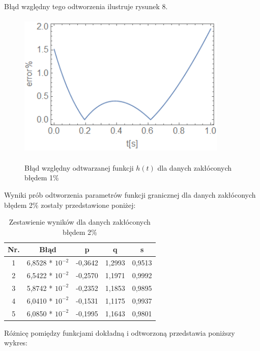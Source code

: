 \documentclass[twoside]{projektInzynierskiMS1}
\begin{document}
Błąd względny tego odtworzenia ilustruje rysunek 8. \\

\begin{figure}[H]
\begin{center}
		\includegraphics[height=7cm, width=10cm]{pics/1abs.png}\\
	\caption{Błąd względny odtwarzanej funkcji $h(t)$ dla danych zakłóconych błędem 1\%}
\end{center}
\end{figure}
\newpage
Wyniki prób odtworzenia parametrów funkcji granicznej dla danych zakłóconych błędem 2\% zostały przedstawione poniżej: \\

\begin{table}[htbp]\centering
\def\sym#1{\ifmmode^{#1}\else\(^{#1}\)\fi}
\caption{Zestawienie wyników dla danych zakłóconych błędem 2\%}
\renewcommand\arraystretch{1.333}
\begin{tabular}{|c|c|c|c|c|} 
                  \hline
\textbf{Nr.}& \textbf{Błąd} &\textbf{p} & \textbf{q} & \textbf{s}\\ \hline
1& 6,8528 * $10^{-2}$  & -0,3642 & 1,2993  & 0,9513 \\ \hline 
2& 6,5422 * $10^{-2}$  & -0,2570 & 1,1971  & 0,9992 \\ \hline 
3& 5,8742 * $10^{-2}$  & -0,2352 & 1,1853  & 0,9895 \\ \hline 
4& 6,0410 * $10^{-2}$  & -0,1531 & 1,1175  & 0,9937 \\ \hline 
5& 6,0850 * $10^{-2}$  & -0,1995 & 1,1643  & 0,9801 \\ \hline 
\end{tabular}
\end{table}

Różnicę pomiędzy funkcjami dokładną i odtworzoną przedstawia poniższy wykres: \\
\end{document}
